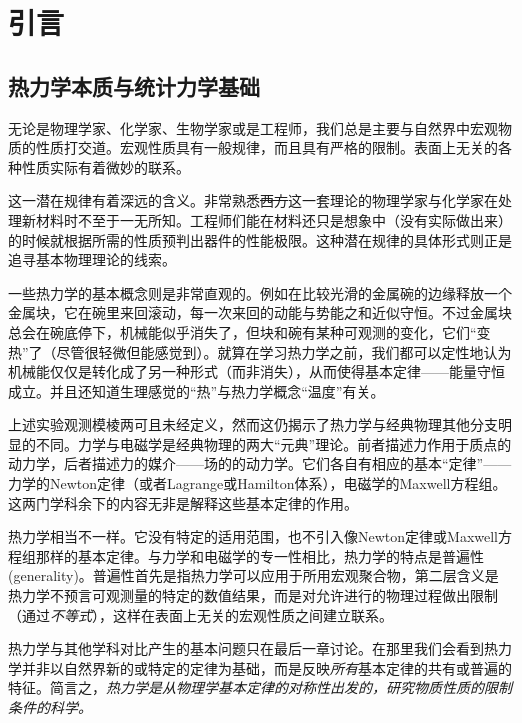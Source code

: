 


\chapter*{引言}
\section*{热力学本质与统计力学基础}

无论是物理学家、化学家、生物学家或是工程师，我们总是主要与自然界中宏观物质的性质打交道。宏观性质具有一般规律，而且具有严格的限制。表面上无关的各种性质实际有着微妙的联系。

这一潜在规律有着深远的含义。非常熟悉\sout{西方}这一套理论的物理学家与化学家在处理新材料时不至于一无所知。工程师们能在材料还只是想象中（没有实际做出来）的时候就根据所需的性质预判出器件的性能极限。这种潜在规律的具体形式则正是追寻基本物理理论的线索。

一些热力学的基本概念则是非常直观的。例如在比较光滑的金属碗的边缘释放一个金属块，它在碗里来回滚动，每一次来回的动能与势能之和近似守恒。不过金属块总会在碗底停下，机械能似乎消失了，但块和碗有某种可观测的变化，它们“变热”了（尽管很轻微但能感觉到）。就算在学习热力学之前，我们都可以定性地认为机械能仅仅是转化成了另一种形式（而非消失），从而使得基本定律——能量守恒成立。并且还知道生理感觉的“热”与热力学概念“温度”有关。

上述实验观测模棱两可且未经定义，然而这仍揭示了热力学与经典物理其他分支明显的不同。力学与电磁学是经典物理的两大“元典”理论。前者描述力作用于质点的动力学，后者描述力的媒介——场的的动力学。它们各自有相应的基本“定律”——力学的Newton定律（或者Lagrange或Hamilton体系），电磁学的Maxwell方程组。这两门学科余下的内容无非是解释这些基本定律的作用。

热力学相当不一样。它没有特定的适用范围，也不引入像Newton定律或Maxwell方程组那样的基本定律。与力学和电磁学的专一性相比，热力学的特点是普遍性(generality)。普遍性首先是指热力学可以应用于所用宏观聚合物，第二层含义是热力学不预言可观测量的特定的数值结果，而是对允许进行的物理过程做出限制（通过{\it 不等式}），这样在表面上无关的宏观性质之间建立联系。

热力学与其他学科对比产生的基本问题只在最后一章讨论。在那里我们会看到热力学并非以自然界新的或特定的定律为基础，而是反映{\it 所有}基本定律的共有或普遍的特征。简言之，{\it 热力学是从物理学基本定律的对称性出发的，研究物质性质的限制条件的科学。}

